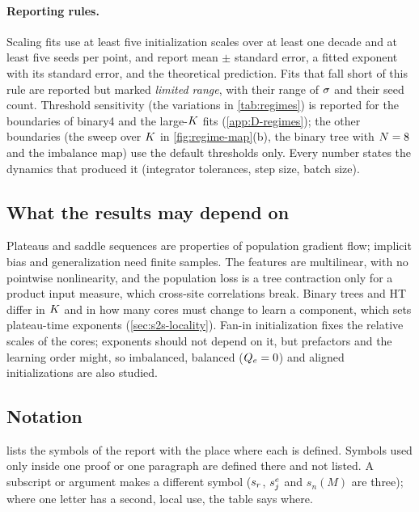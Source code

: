 \paragraph{Reporting rules.}
Scaling fits use at least five initialization scales over at least one decade and at least five
seeds per point, and report mean $\pm$ standard error, a fitted exponent with its standard error,
and the theoretical prediction. Fits that fall short of this rule are reported but marked
\emph{limited range}, with their range of $\sigma$ and their seed count. Threshold sensitivity (the
variations in \cref{tab:regimes}) is reported for the boundaries of binary4 and the large-$K$ fits
(\cref{app:D-regimes}); the other boundaries (the sweep over $K$ in \cref{fig:regime-map}(b), the binary
tree with $N=8$ and the imbalance map) use the default thresholds only. Every number states the dynamics
that produced it (integrator tolerances, step size, batch size).

\subsection{What the results may depend on}\label{sec:setup-scope}

Plateaus and saddle sequences are properties of population gradient flow; implicit bias and
generalization need finite samples. The features are multilinear, with no pointwise nonlinearity, and
the population loss is a tree contraction only for a product input measure, which cross-site
correlations break. Binary trees and HT differ in $K$ and in how many cores must change to learn a
component, which sets plateau-time exponents (\cref{sec:s2s-locality}). Fan-in initialization fixes
the relative scales of the cores; exponents should not depend on it, but prefactors and the learning
order might, so imbalanced, balanced ($Q_{e}=0$) and aligned initializations are also studied.

\subsection{Notation}\label{sec:setup-notation}

 lists the symbols of the report with the place where each is defined. Symbols used
only inside one proof or one paragraph are defined there and not listed. A subscript or argument makes a
different symbol ($s_{r}$, $s^{e}_{j}$ and $s_n(M)$ are three); where one letter has a second, local use, the
table says where.

